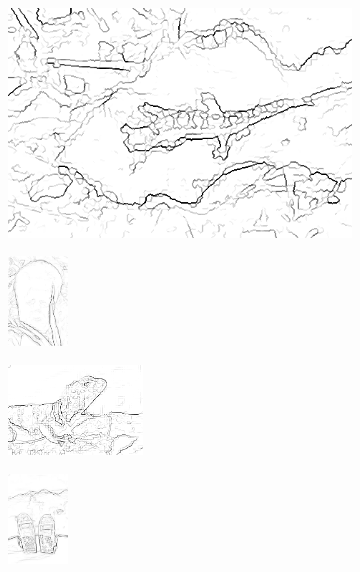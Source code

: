 \documentclass[journal]{IEEEtran}
\begin{document}
\begin{figure}[!ht]
    \begin{subfigure}[t]{\textwidth+20pt\relax}
    	\centering
    	\includegraphics[width=\dimexpr\linewidth-20pt\relax]{175083_2500sp_cont} 
    \end{subfigure}      
    \begin{subfigure}[b]{0.23\textwidth}
    	\centering
        \includegraphics[height=67.68857pt]{101084_2500sp_cont}
    \end{subfigure}
    \begin{subfigure}[b]{0.23\textwidth}
    	\centering
        \includegraphics[height=67.68857pt]{41096_2500sp_cont}
    \end{subfigure}
    \begin{subfigure}[b]{0.23\textwidth}
    	\centering
        \includegraphics[height=67.68857pt]{2018_2500sp_cont}
    \end{subfigure}   
    

\end{figure}
\end{document}
